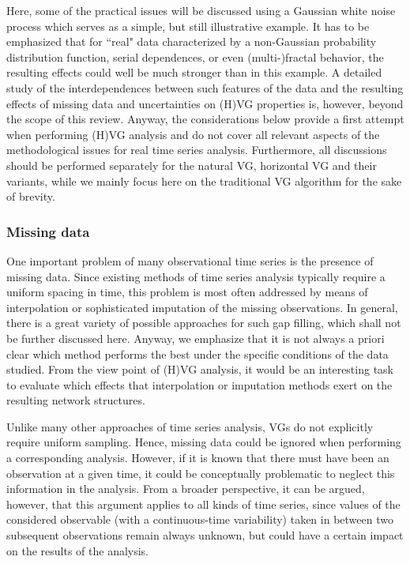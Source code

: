 		Here, some of the practical issues will be discussed using a Gaussian white noise process which serves as a simple, but still illustrative example. It has to be emphasized that for ``real" data characterized by a non-Gaussian probability distribution function, serial dependences, or even (multi-)fractal behavior, the resulting effects could well be much stronger than in this example. A detailed study of the interdependences between such features of the data and the resulting effects of missing data and uncertainties on (H)VG properties is, however, beyond the scope of this review. Anyway, the considerations below provide a first attempt when performing (H)VG analysis and do not cover all relevant aspects of the methodological issues for real time series analysis. Furthermore, all discussions should be performed separately for the natural VG, horizontal VG and their variants, while we mainly focus here on the traditional VG algorithm for the sake of brevity. 

		\subsubsection{Missing data}
		One important problem of many observational time series is the presence of missing data. Since existing methods of time series analysis typically require a uniform spacing in time, this problem is most often addressed by means of interpolation or sophisticated imputation of the missing observations. In general, there is a great variety of possible approaches for such gap filling, which shall not be further discussed here. Anyway, we emphasize that it is not always a priori clear which method performs the best under the specific conditions of the data studied. From the view point of (H)VG analysis, it would be an interesting task to evaluate which effects that interpolation or imputation methods exert on the resulting network structures. 
		
		Unlike many other approaches of time series analysis, VGs do not explicitly require uniform sampling. Hence, missing data could be ignored when performing a corresponding analysis. However, if it is known that there must have been an observation at a given time, it could be conceptually problematic to neglect this information in the analysis. From a broader perspective, it can be argued, however, that this argument applies to all kinds of time series, since values of the considered observable (with a continuous-time variability) taken in between two subsequent observations remain always unknown, but could have a certain impact on the results of the analysis. 
		
